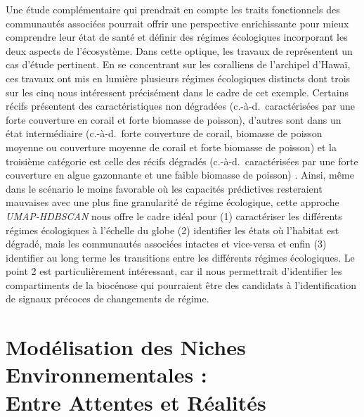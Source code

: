 \begin{refsection}
Une étude complémentaire qui prendrait en compte les traits fonctionnels
des communautés associées pourrait offrir une perspective enrichissante
pour mieux comprendre leur état de santé \textcite{Villeger_2010} et
définir des régimes écologiques incorporant les deux aspects de
l'écosystème. Dans cette optique, les travaux de \textcite{Donovan_2018}
représentent un cas d'étude pertinent. En se concentrant sur les
coralliens de l'archipel d'Hawaï, ces travaux ont mis en lumière
plusieurs régimes écologiques distincts dont trois sur les cinq nous
intéressent précisément dans le cadre de cet exemple. Certains récifs
présentent des caractéristiques non dégradées (c.-à-d.~caractérisées par
une forte couverture en corail et forte biomasse de poisson), d'autres
sont dans un état intermédiaire (c.-à-d.~forte couverture de corail,
biomasse de poisson moyenne ou couverture moyenne de corail et forte
biomasse de poisson) et la troisième catégorie est celle des récifs
dégradés (c.-à-d.~caractérisées par une forte couverture en algue
gazonnante et une faible biomasse de poisson) \autocite{Donovan_2018}.
Ainsi, même dans le scénario le moins favorable où les capacités
prédictives resteraient mauvaises avec une plus fine granularité de
régime écologique, cette approche \emph{UMAP-HDBSCAN} nous offre le
cadre idéal pour (1) caractériser les différents régimes écologiques à
l'échelle du globe (2) identifier les états où l'habitat est dégradé,
mais les communautés associées intactes et vice-versa et enfin (3)
identifier au long terme les transitions entre les différents régimes
écologiques. Le point 2 est particulièrement intéressant, car il nous
permettrait d'identifier les compartiments de la biocénose qui
pourraient être des candidats à l'identification de signaux précoces de
changements de régime.

\clearpage

\hypertarget{moduxe9lisation-des-niches-environnementales-entre-attentes-et-ruxe9alituxe9s}{%
\section{Modélisation des Niches Environnementales : \\Entre Attentes et
Réalités}\label{moduxe9lisation-des-niches-environnementales-entre-attentes-et-ruxe9alituxe9s}}


\end{refsection}
